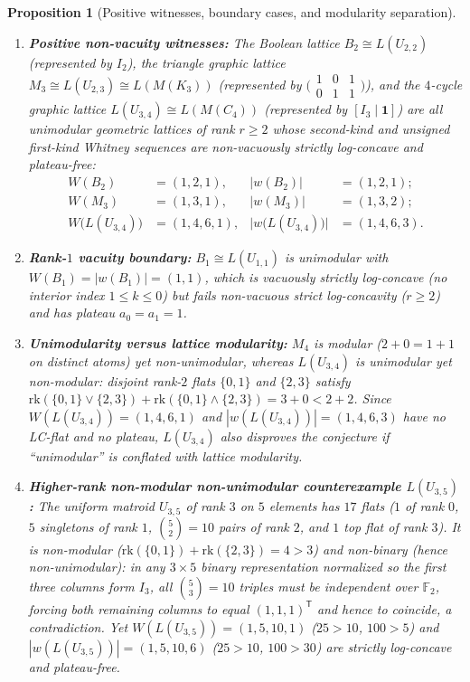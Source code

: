 \documentclass[11pt]{article}
\newtheorem{proposition}[theorem]{Proposition}
\theoremstyle{definition}
\theoremstyle{remark}
\newcommand{\rk}{\mathrm{rk}}
\newcommand{\F}{\mathbb{F}}
\begin{document}
\begin{proposition}[Positive witnesses, boundary cases, and modularity separation]
\label{prop:boundary}
\leavevmode
\begin{enumerate}
  \item[(1)] \textbf{Positive non-vacuity witnesses:} The Boolean lattice $B_2 \cong L(U_{2,2})$
    (represented by $I_2$), the triangle graphic lattice $M_3 \cong L(U_{2,3}) \cong L(M(K_3))$
    (represented by $\bigl(\begin{smallmatrix}1 & 0 & 1\\ 0 & 1 & 1\end{smallmatrix}\bigr)$), and
    the $4$-cycle graphic lattice $L(U_{3,4}) \cong L(M(C_4))$ (represented by $[I_3 \mid \mathbf{1}]$)
    are all unimodular geometric lattices of rank $r \ge 2$ whose second-kind and unsigned
    first-kind Whitney sequences are non-vacuously strictly log-concave and plateau-free:
    \begin{align*}
      W(B_2) &= (1, 2, 1), & |w(B_2)| &= (1, 2, 1); \\
      W(M_3) &= (1, 3, 1), & |w(M_3)| &= (1, 3, 2); \\
      W\bigl(L(U_{3,4})\bigr) &= (1, 4, 6, 1), & \bigl|w\bigl(L(U_{3,4})\bigr)\bigr| &= (1, 4, 6, 3).
    \end{align*}
  \item[(2)] \textbf{Rank-$1$ vacuity boundary:} $B_1 \cong L(U_{1,1})$ is unimodular with
    $W(B_1) = |w(B_1)| = (1, 1)$, which is vacuously strictly log-concave (no interior index
    $1 \le k \le 0$) but fails non-vacuous strict log-concavity ($r \ge 2$) and has plateau
    $a_0 = a_1 = 1$.
  \item[(3)] \textbf{Unimodularity versus lattice modularity:} $M_4$ is modular ($2 + 0 = 1 + 1$ on
    distinct atoms) yet non-unimodular, whereas $L(U_{3,4})$ is unimodular yet non-modular:
    disjoint rank-$2$ flats $\{0,1\}$ and $\{2,3\}$ satisfy
    $\rk(\{0,1\} \vee \{2,3\}) + \rk(\{0,1\} \wedge \{2,3\}) = 3 + 0 < 2 + 2$. Since
    $W(L(U_{3,4})) = (1, 4, 6, 1)$ and $|w(L(U_{3,4}))| = (1, 4, 6, 3)$ have no LC-flat and no
    plateau, $L(U_{3,4})$ also disproves the conjecture if ``unimodular'' is conflated with
    lattice modularity.
  \item[(4)] \textbf{Higher-rank non-modular non-unimodular counterexample $L(U_{3,5})$:} The uniform
    matroid $U_{3,5}$ of rank $3$ on $5$ elements has $17$ flats ($1$ of rank $0$, $5$ singletons
    of rank $1$, $\binom{5}{2} = 10$ pairs of rank $2$, and $1$ top flat of rank $3$). It is
    non-modular ($\rk(\{0,1\}) + \rk(\{2,3\}) = 4 > 3$) and non-binary (hence non-unimodular): in
    any $3 \times 5$ binary representation normalized so the first three columns form $I_3$, all
    $\binom{5}{3} = 10$ triples must be independent over $\F_2$, forcing both remaining columns
    to equal $(1,1,1)^{\mathsf{T}}$ and hence to coincide, a contradiction. Yet
    $W(L(U_{3,5})) = (1, 5, 10, 1)$ ($25 > 10$, $100 > 5$) and
    $|w(L(U_{3,5}))| = (1, 5, 10, 6)$ ($25 > 10$, $100 > 30$) are strictly log-concave and
    plateau-free.
\end{enumerate}
\end{proposition}
\end{document}
